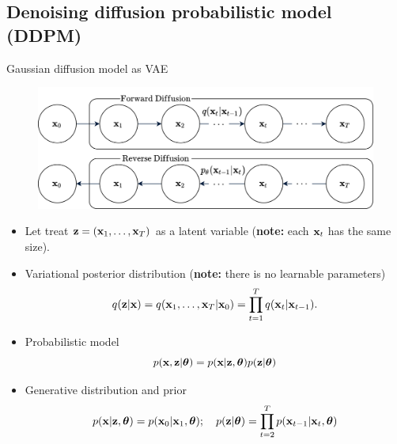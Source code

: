 \subsection{Denoising diffusion probabilistic model (DDPM)}
\begin{frame}{Gaussian diffusion model as VAE}
	\vspace{-0.2cm}
	\begin{figure}
		\includegraphics[width=0.65\linewidth]{figs/diffusion_pgm}
	\end{figure}
	\begin{itemize}
		\item Let treat $\mathbf{z} = (\mathbf{x}_1, \dots, \mathbf{x}_T)$ as a latent variable (\textbf{note:} each $\mathbf{x}_t$ has the same size).
		\item Variational posterior distribution (\textbf{note:} there is no learnable parameters)
		\vspace{-0.4cm}
		\[
			q(\mathbf{z} | \mathbf{x}) = q(\mathbf{x}_1, \dots, \mathbf{x}_T | \mathbf{x}_0) = \prod_{t = 1}^T q(\mathbf{x}_t | \mathbf{x}_{t - 1}).
		\]
		\vspace{-0.5cm}
		\item Probabilistic model
		\vspace{-0.2cm}
		\[
			p(\mathbf{x}, \mathbf{z} | \boldsymbol{\theta}) = p(\mathbf{x} | \mathbf{z}, \boldsymbol{\theta}) p(\mathbf{z} | \boldsymbol{\theta})
		\]
		\item Generative distribution and prior
		\vspace{-0.3cm}
		\[
			p(\mathbf{x} | \mathbf{z}, \boldsymbol{\theta}) = p(\mathbf{x}_0 | \mathbf{x}_1, \boldsymbol{\theta}); \quad 
			p(\mathbf{z} | \boldsymbol{\theta}) = \prod_{t=2}^T p(\mathbf{x}_{t - 1} | \mathbf{x}_t, \boldsymbol{\theta})
		\]
	\end{itemize}
\end{frame}

